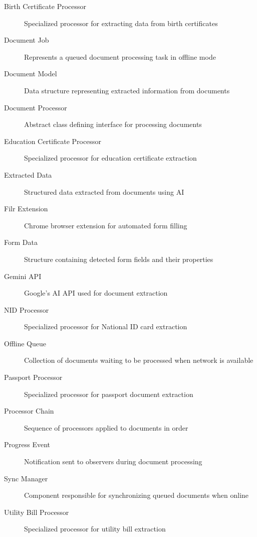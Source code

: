\documentclass[11pt, a4paper]{article}
\theoremstyle{plain}
\theoremstyle{definition}
\begin{document}
\begin{description}
    \item[Birth Certificate Processor] Specialized processor for extracting data from birth certificates
    
    \item[Document Job] Represents a queued document processing task in offline mode
    
    \item[Document Model] Data structure representing extracted information from documents
    
    \item[Document Processor] Abstract class defining interface for processing documents
    
    \item[Education Certificate Processor] Specialized processor for education certificate extraction
    
    \item[Extracted Data] Structured data extracted from documents using AI
    
    \item[Filr Extension] Chrome browser extension for automated form filling
    
    \item[Form Data] Structure containing detected form fields and their properties
    
    \item[Gemini API] Google's AI API used for document extraction
    
    \item[NID Processor] Specialized processor for National ID card extraction
    
    \item[Offline Queue] Collection of documents waiting to be processed when network is available
    
    \item[Passport Processor] Specialized processor for passport document extraction
    
    \item[Processor Chain] Sequence of processors applied to documents in order
    
    \item[Progress Event] Notification sent to observers during document processing
    
    \item[Sync Manager] Component responsible for synchronizing queued documents when online
    
    \item[Utility Bill Processor] Specialized processor for utility bill extraction
\end{description}
\end{document}
